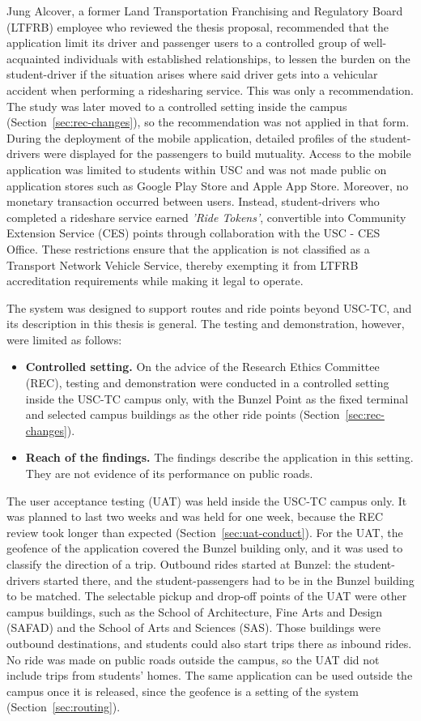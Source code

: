 Jung Alcover, a former Land Transportation Franchising and Regulatory Board (LTFRB) employee who reviewed the thesis proposal, recommended that the application limit its driver and passenger users to a controlled group of well-acquainted individuals with established relationships, to lessen the burden on the student-driver if the situation arises where said driver gets into a vehicular accident when performing a ridesharing service. This was only a recommendation. The study was later moved to a controlled setting inside the campus (Section~\ref{sec:rec-changes}), so the recommendation was not applied in that form. During the deployment of the mobile application, detailed profiles of the student-drivers were displayed for the passengers to build mutuality. Access to the mobile application was limited to students within USC and was not made public on application stores such as Google Play Store and Apple App Store. Moreover, no monetary transaction occurred between users. Instead, student-drivers who completed a rideshare service earned \textit{'Ride Tokens'}, convertible into Community Extension Service (CES) points through collaboration with the USC - CES Office. These restrictions ensure that the application is not classified as a Transport Network Vehicle Service, thereby exempting it from LTFRB accreditation requirements while making it legal to operate. 

The system was designed to support routes and ride points beyond USC-TC, and its description in this thesis is general. The testing and demonstration, however, were limited as follows:
\begin{itemize}
    \item \textbf{Controlled setting.} On the advice of the Research Ethics Committee (REC), testing and demonstration were conducted in a controlled setting inside the USC-TC campus only, with the Bunzel Point as the fixed terminal and selected campus buildings as the other ride points (Section~\ref{sec:rec-changes}).
    \item \textbf{Reach of the findings.} The findings describe the application in this setting. They are not evidence of its performance on public roads.
\end{itemize}

The user acceptance testing (UAT) was held inside the USC-TC campus only. It was planned to last two weeks and was held for one week, because the REC review took longer than expected (Section~\ref{sec:uat-conduct}). For the UAT, the geofence of the application covered the Bunzel building only, and it was used to classify the direction of a trip. Outbound rides started at Bunzel: the student-drivers started there, and the student-passengers had to be in the Bunzel building to be matched. The selectable pickup and drop-off points of the UAT were other campus buildings, such as the School of Architecture, Fine Arts and Design (SAFAD) and the School of Arts and Sciences (SAS). Those buildings were outbound destinations, and students could also start trips there as inbound rides. No ride was made on public roads outside the campus, so the UAT did not include trips from students' homes. The same application can be used outside the campus once it is released, since the geofence is a setting of the system (Section~\ref{sec:routing}).

